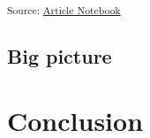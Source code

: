 \documentclass[
  number]{elsarticle}
\begin{document}
\textsubscript{Source:
\href{https://SigOiry.github.io/Drone_Paper_2023/index.qmd.html}{Article
Notebook}}

\subsection{Big picture}\label{big-picture}

\section{Conclusion}\label{conclusion}


\renewcommand\refname{Bibliography}
  
\end{document}
